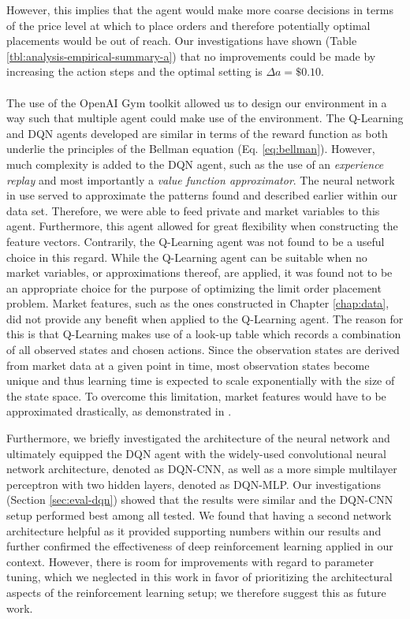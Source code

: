    However, this implies that the agent would make more coarse decisions in terms of the price level at which to place orders and therefore potentially optimal placements would be out of reach.
    Our investigations have shown (Table \ref{tbl:analysis-empirical-summary-a}) that no improvements could be made by increasing the action steps and the optimal setting is $\Delta{a}=\$0.10$.
    \\
    \\
    The use of the OpenAI Gym toolkit\cite{brockman2016openai} allowed us to design our environment in a way such that multiple agent could make use of the environment.
    The Q-Learning and DQN agents developed are similar in terms of the reward function as both underlie the principles of the Bellman equation (Eq. \ref{eq:bellman}).
    However, much complexity is added to the DQN agent, such as the use of an \textit{experience replay} and most importantly a \textit{value function approximator}.
    The neural network in use served to approximate the patterns found and described earlier within our data set.
    Therefore, we were able to feed private and market variables to this agent.
    Furthermore, this agent allowed for great flexibility when constructing the feature vectors.
    Contrarily, the Q-Learning agent was not found to be a useful choice in this regard.
    While the Q-Learning agent can be suitable when no market variables, or approximations thereof, are applied, it was found not to be an appropriate choice for the purpose of optimizing the limit order placement problem.
    Market features, such as the ones constructed in Chapter \ref{chap:data}, did not provide any benefit when applied to the Q-Learning agent.
    The reason for this is that Q-Learning makes use of a look-up table which records a combination of all observed states and chosen actions.
    Since the observation states are derived from market data at a given point in time, most observation states become unique and thus learning time is expected to scale exponentially with the size of the state space\cite{whitehead1991complexity, kaelbling1996reinforcement}.
    To overcome this limitation, market features would have to be approximated drastically, as demonstrated in \cite{nevmyvaka2006reinforcement}.
    
    Furthermore, we briefly investigated the architecture of the neural network and ultimately equipped the DQN agent with the widely-used convolutional neural network architecture\cite{mnih2015human}, denoted as DQN-CNN, as well as a more simple multilayer perceptron with two hidden layers, denoted as DQN-MLP.
    Our investigations (Section \ref{sec:eval-dqn}) showed that the results were similar and the DQN-CNN setup performed best among all tested.
    We found that having a second network architecture helpful as it provided supporting numbers within our results and further confirmed the effectiveness of deep reinforcement learning applied in our context.
    However, there is room for improvements with regard to parameter tuning, which we neglected in this work in favor of prioritizing the architectural aspects of the reinforcement learning setup; we therefore suggest this as future work.

